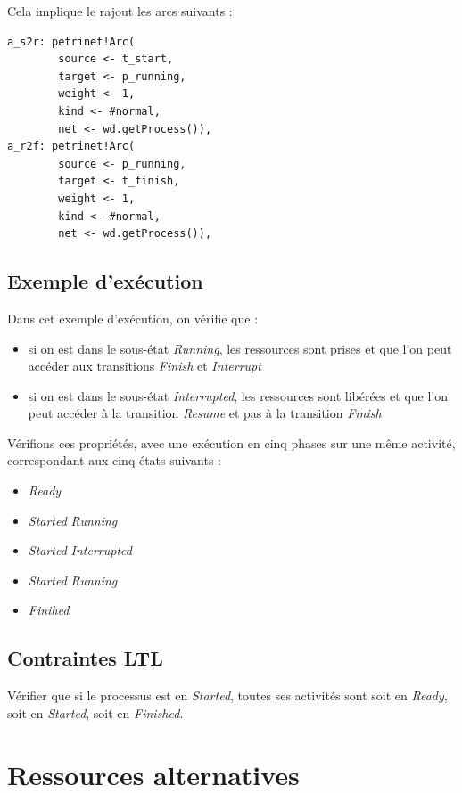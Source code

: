 Cela implique le rajout les arcs suivants :
\begin{verbatim}
a_s2r: petrinet!Arc(
        source <- t_start,
        target <- p_running,
        weight <- 1,
        kind <- #normal,
        net <- wd.getProcess()),
a_r2f: petrinet!Arc(
        source <- p_running,
        target <- t_finish,
        weight <- 1,
        kind <- #normal,
        net <- wd.getProcess()),
\end{verbatim}

\subsection{Exemple d'exécution}

Dans cet exemple d'exécution, on vérifie que :
\begin{itemize}
\item si on est dans le sous-état \textit{Running}, les ressources sont prises et que l'on peut accéder aux transitions \textit{Finish} et \textit{Interrupt}
\item si on est dans le sous-état \textit{Interrupted}, les ressources sont libérées et que l'on peut accéder à la transition \textit{Resume} et pas à la transition \textit{Finish}\\
\end{itemize}

Vérifions ces propriétés, avec une exécution en cinq phases sur une même activité, correspondant aux cinq états suivants :
\begin{itemize}
\item \textit{Ready}
\item \textit{Started} \textit{Running}
\item \textit{Started} \textit{Interrupted}
\item \textit{Started} \textit{Running}
\item \textit{Finihed}
\end{itemize}

\subsection{Contraintes LTL}

Vérifier que si le processus est en \textit{Started}, toutes ses activités sont soit en \textit{Ready}, soit en \textit{Started}, soit en \textit{Finished}.

\section{Ressources alternatives}

